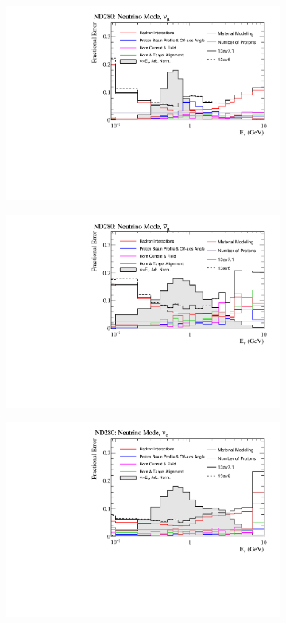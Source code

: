 \begin{figure}
\begin{subfigure}{.49\textwidth}
  \centering
  \includegraphics[width=0.99\linewidth]{figs/flux_error_t2k_nd5_fhc_numu}
\end{subfigure}
\begin{subfigure}{.49\textwidth}
  \centering
  \includegraphics[width=0.99\linewidth]{figs/flux_error_t2k_nd5_fhc_numubar}
\end{subfigure}
\begin{subfigure}{.49\textwidth}
  \centering
  \includegraphics[width=0.99\linewidth]{figs/flux_error_t2k_nd5_fhc_nue}

\end{subfigure}
\end{figure}
